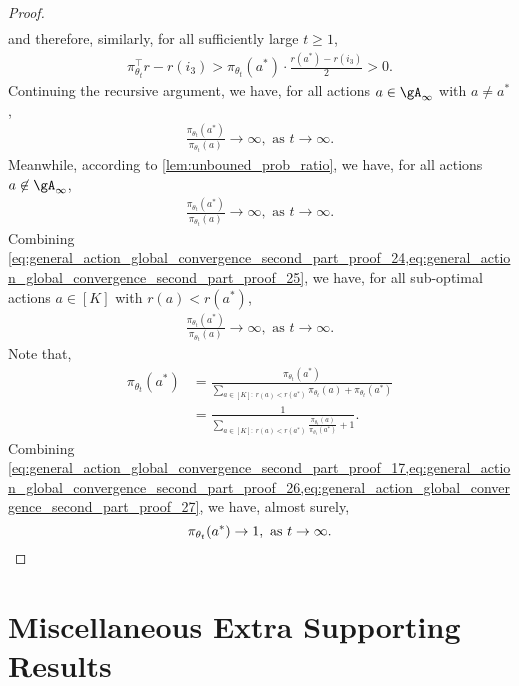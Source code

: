 \begin{proof}
\begin{align}
\end{align}
and therefore, similarly, for all sufficiently large $t \ge 1$,
\begin{align}
\label{eq:general_action_global_convergence_second_part_proof_23}
    \pi_{\theta_t}^\top r - r(i_3) > \pi_{\theta_t}(a^*) \cdot \frac{ r(a^*) - r(i_3)}{2} > 0.
\end{align}
Continuing the recursive argument, we have, for all actions $a \in \gA_\infty$ with $a \ne a^*$,
\begin{align}
\label{eq:general_action_global_convergence_second_part_proof_24}
    \frac{ \pi_{\theta_t}(a^*) }{ \pi_{\theta_t}(a)} \to \infty, \text{ as } t \to \infty.
\end{align}
Meanwhile, according to \cref{lem:unbouned_prob_ratio}, we have, for all actions $a \not\in \gA_\infty$,
\begin{align}
\label{eq:general_action_global_convergence_second_part_proof_25}
    \frac{ \pi_{\theta_t}(a^*) }{ \pi_{\theta_t}(a)} \to \infty, \text{ as } t \to \infty.
\end{align}
Combining \cref{eq:general_action_global_convergence_second_part_proof_24,eq:general_action_global_convergence_second_part_proof_25}, we have, for all sub-optimal actions $a \in [K]$ with $r(a) < r(a^*)$,
\begin{align}
\label{eq:general_action_global_convergence_second_part_proof_26}
    \frac{ \pi_{\theta_t}(a^*) }{ \pi_{\theta_t}(a)} \to \infty, \text{ as } t \to \infty.
\end{align}
Note that,
\begin{align}
\label{eq:general_action_global_convergence_second_part_proof_27}
    \pi_{\theta_t}(a^*)
    &= \frac{\pi_{\theta_t}(a^*)}{ \sum_{a \in [K]: \ r(a) < r(a^*)} \pi_{\theta_t}(a) +  \pi_{\theta_t}(a^*)} \\
    &= \frac{1}{ \sum_{a \in [K]: \ r(a) < r(a^*)} \frac{\pi_{\theta_t}(a)}{\pi_{\theta_t}(a^*)}  +  1}.
\end{align}
Combining \cref{eq:general_action_global_convergence_second_part_proof_17,eq:general_action_global_convergence_second_part_proof_26,eq:general_action_global_convergence_second_part_proof_27}, we have, almost surely,
\begin{equation*}
    \pi_{\theta_t}(a^*) \to 1, \text{ as } t \to \infty. \qedhere
\end{equation*}
\end{proof}

\section{Miscellaneous Extra Supporting Results}

